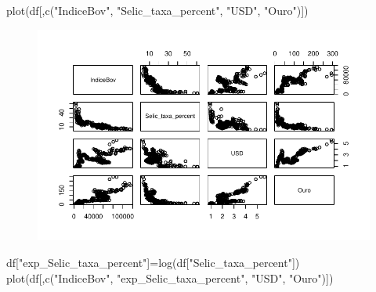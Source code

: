 \documentclass[
  letterpaper,
  DIV=11,
  numbers=noendperiod]{scrartcl}
\newenvironment{Shaded}{\begin{snugshade}}{\end{snugshade}}
\newcommand{\FunctionTok}[1]{\textcolor[rgb]{0.28,0.35,0.67}{#1}}
\newcommand{\NormalTok}[1]{\textcolor[rgb]{0.00,0.23,0.31}{#1}}
\newcommand{\OtherTok}[1]{\textcolor[rgb]{0.00,0.23,0.31}{#1}}
\newcommand{\StringTok}[1]{\textcolor[rgb]{0.13,0.47,0.30}{#1}}
\begin{document}
\begin{Shaded}
\begin{Highlighting}[]
\FunctionTok{plot}\NormalTok{(df[,}\FunctionTok{c}\NormalTok{(}\StringTok{"IndiceBov"}\NormalTok{, }\StringTok{"Selic\_taxa\_percent"}\NormalTok{, }\StringTok{"USD"}\NormalTok{, }\StringTok{"Ouro"}\NormalTok{)])}
\end{Highlighting}
\end{Shaded}

\begin{figure}[H]

{\centering \includegraphics{DemonstracaoStrucchange_files/figure-pdf/unnamed-chunk-4-1.pdf}

}

\end{figure}

\begin{Shaded}
\begin{Highlighting}[]
\NormalTok{df[}\StringTok{"exp\_Selic\_taxa\_percent"}\NormalTok{]}\OtherTok{=}\FunctionTok{log}\NormalTok{(df[}\StringTok{"Selic\_taxa\_percent"}\NormalTok{])}
\FunctionTok{plot}\NormalTok{(df[,}\FunctionTok{c}\NormalTok{(}\StringTok{"IndiceBov"}\NormalTok{, }\StringTok{"exp\_Selic\_taxa\_percent"}\NormalTok{, }\StringTok{"USD"}\NormalTok{, }\StringTok{"Ouro"}\NormalTok{)])}
\end{Highlighting}
\end{Shaded}
\end{document}
